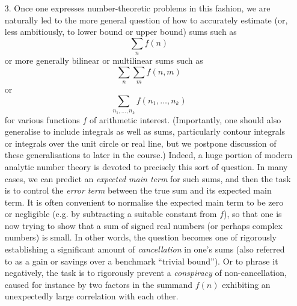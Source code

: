 \documentclass[10pt,reqno]{amsart}
\begin{document}
\begin{enumerate}
    \item[3.] Once one expresses number-theoretic problems in this fashion, we are naturally led to the more general question of how to accurately estimate (or, less ambitiously, to lower bound or upper bound) sums such as
    \[ \sum_n f(n) \]
    or more generally bilinear or multilinear sums such as
    \[ \sum_n \sum_m f(n,m) \]
    or
    \[ \sum_{n_1,\dots,n_k} f(n_1,\dots,n_k) \]
    for various functions $f$ of arithmetic interest. (Importantly, one should also generalise to include integrals as well as sums, particularly contour integrals or integrals over the unit circle or real line, but we postpone discussion of these generalisations to later in the course.) Indeed, a huge portion of modern analytic number theory is devoted to precisely this sort of question. In many cases, we can predict an \emph{expected main term} for such sums, and then the task is to control the \emph{error term} between the true sum and its expected main term. It is often convenient to normalise the expected main term to be zero or negligible (e.g. by subtracting a suitable constant from $f$), so that one is now trying to show that a sum of signed real numbers (or perhaps complex numbers) is small. In other words, the question becomes one of rigorously establishing a significant amount of \emph{cancellation} in one’s sums (also referred to as a gain or savings over a benchmark “trivial bound”). Or to phrase it negatively, the task is to rigorously prevent a \emph{conspiracy} of non-cancellation, caused for instance by two factors in the summand $f(n)$ exhibiting an unexpectedly large correlation with each other.


\end{enumerate}
\end{document}
